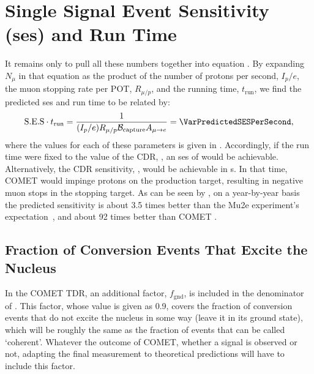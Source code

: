 \section{Single Signal Event Sensitivity (\acs{ses}) and Run Time}
\TabSensParams
It remains only to pull all these numbers together into equation .
By expanding $N_\mu$ in that equation as the product of the number of protons per second, $I_p/e$, the muon stopping rate per \ac{POT}, $R_{\mu/p}$, and the running time, $t_\textrm{run}$, we find the predicted \ac{ses} and run time to be related by:
\begin{align}
	\eqlabel{sense:runtime}
	\mathrm{S.E.S}\cdot{}t_\textrm{run}=\frac{1}{(I_p/e){R}_{\mu/p}\mathcal{B}_\mathrm{capture} A_{\mu\rightarrow e}}=\VarPredictedSESPerSecond,
\end{align}
where the values for each of these parameters is given in .  
Accordingly, if the run time were fixed to the value of the CDR, \VarCDRRunTime[2], an \ac{ses} of \VarPredictedSESCDRRunTime would be achievable.
Alternatively, the CDR sensitivity, \VarPredictedSES, would be achievable in \VarRunTime[2]s.  
In that time, COMET \phaseII would impinge \VarTotalPOT protons on the production target, resulting in \VarTotalMuStops negative muon stops in the stopping target.
As can be seen by , on a year-by-year basis the predicted \phaseII sensitivity is about 3.5 times better than the Mu2e experiment's expectation~\cite{Mu2e2014}, and about 92 times better than COMET \phaseI.
\TabSensEstimates

\subsection{Fraction of Conversion Events That Excite the Nucleus}
In the COMET \phaseI TDR, an additional factor, $f_\textrm{gnd}$, is included in the denominator of .
This factor, whose value is given as 0.9, covers the fraction of conversion events that do not excite the nucleus in some way (\ie leave it in its ground state), which will be roughly the same as the fraction of events that can be called `coherent'.
Whatever the outcome of COMET, whether a signal is observed or not, adapting the final measurement to theoretical predictions will have to include this factor.

